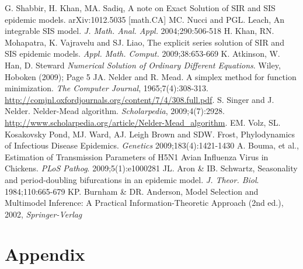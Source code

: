 \documentclass[11pt, a4paper, oneside,titlepage]{article}
\begin{document}
\begin{thebibliography}{1}
        G. Shabbir, H. Khan, MA. Sadiq, A note on Exact Solution of SIR and
        SIS epidemic models. arXiv:1012.5035 [math.CA]
        MC. Nucci and PGL. Leach, An integrable SIS model. \emph{J. Math. Anal. Appl.} 2004;290:506-518
        H. Khan, RN. Mohapatra, K. Vajravelu and SJ. Liao, The explicit
        series solution of SIR and SIS epidemic
        models. \emph{Appl. Math. Comput.} 2009;38:653-669
        K. Atkinson, W. Han, D. Steward \emph{Numerical Solution of
          Ordinary Different Equations}. Wiley, Hoboken (2009); Page 5
  JA. Nelder and R. Mead. A simplex method for function
  minimization. \emph{The Computer Journal},
  1965;7(4):308-313. \url{http://comjnl.oxfordjournals.org/content/7/4/308.full.pdf}.
  S. Singer and J. Nelder. Nelder-Mead algorithm. \emph{Scholarpedia},
  2009;4(7):2928.
  \url{http://www.scholarpedia.org/article/Nelder-Mead_algorithm}. 
  EM. Volz, SL. Kosakovsky Pond, MJ. Ward, AJ. Leigh Brown and
  SDW. Frost, Phylodynamics of Infectious Disease
  Epidemics. \emph{Genetics} 2009;183(4):1421-1430
  A. Bouma, et al., Estimation of Transmission Parameters of H5N1
  Avian Influenza Virus in Chickens. \emph{PLoS Pathog}. 2009;5(1):e1000281
  JL. Aron & IB. Schwartz, Seasonality and period-doubling
  bifurcations in an epidemic model. \emph{J. Theor. Biol}. 1984;110:665-679
  KP. Burnham & DR. Anderson, Model Selection and Multimodel
  Inference: A Practical Information-Theoretic Approach (2nd ed.),
  2002, \emph{Springer-Verlag}


\end{thebibliography}

\section*{Appendix}
\end{document}

